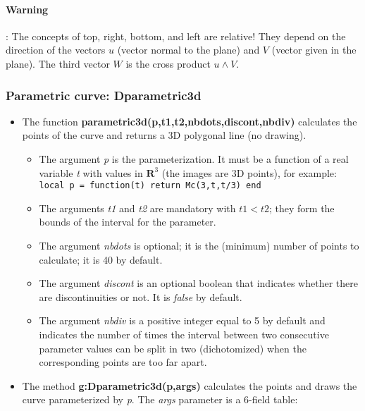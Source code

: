 \paragraph{Warning}: The concepts of top, right, bottom, and left are relative! They depend on the direction of the vectors $u$ (vector normal to the plane) and $V$ (vector given in the plane). The third vector $W$ is the cross product $u\wedge V$.

\subsubsection{Parametric curve: Dparametric3d}

\begin{itemize}
    \item The function \textbf{parametric3d(p,t1,t2,nbdots,discont,nbdiv)} calculates the points of the curve and returns a 3D polygonal line (no drawing).
\begin{itemize}
    \item The argument \emph{p} is the parameterization. It must be a function of a real variable \emph{t} with values ​​in $\mathbf R^3$ (the images are 3D points), for example:
\texttt{local p = function(t) return Mc(3,t,t/3) end}

    \item The arguments \emph{t1} and \emph{t2} are mandatory with \(t1 < t2\); they form the bounds of the interval for the parameter.

    \item The argument \emph{nbdots} is optional; it is the (minimum) number of points to calculate; it is 40 by default.

    \item The argument \emph{discont} is an optional boolean that indicates whether there are discontinuities or not. It is \emph{false} by default.

    \item The argument \emph{nbdiv} is a positive integer equal to 5 by default and indicates the number of times the interval between two consecutive parameter values ​​can be split in two (dichotomized) when the corresponding points are too far apart.
\end{itemize}

    \item The method \textbf{g:Dparametric3d(p,args)} calculates the points and draws the curve parameterized by \emph{p}. The \emph{args} parameter is a 6-field table:


\end{itemize}
